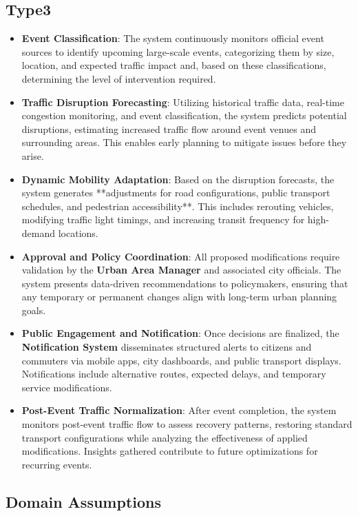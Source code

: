 \documentclass[a4paper,12pt]{article}
\begin{document}
\subsection*{Type3}
\begin{itemize}
    \item \textbf{Event Classification}: The system continuously monitors official event sources to identify upcoming large-scale events, categorizing them by size, location, and expected traffic impact and, based on these classifications, determining the level of intervention required.
    \item \textbf{Traffic Disruption Forecasting}: Utilizing historical traffic data, real-time congestion monitoring, and event classification, the system predicts potential disruptions, estimating increased traffic flow around event venues and surrounding areas. This enables early planning to mitigate issues before they arise.
    \item \textbf{Dynamic Mobility Adaptation}: Based on the disruption forecasts, the system generates **adjustments for road configurations, public transport schedules, and pedestrian accessibility**. This includes rerouting vehicles, modifying traffic light timings, and increasing transit frequency for high-demand locations.
    \item \textbf{Approval and Policy Coordination}: All proposed modifications require validation by the \textbf{Urban Area Manager} and associated city officials. The system presents data-driven recommendations to policymakers, ensuring that any temporary or permanent changes align with long-term urban planning goals.
    \item \textbf{Public Engagement and Notification}: Once decisions are finalized, the \textbf{Notification System} disseminates structured alerts to citizens and commuters via mobile apps, city dashboards, and public transport displays. Notifications include alternative routes, expected delays, and temporary service modifications.
    \item \textbf{Post-Event Traffic Normalization}: After event completion, the system monitors post-event traffic flow to assess recovery patterns, restoring standard transport configurations while analyzing the effectiveness of applied modifications. Insights gathered contribute to future optimizations for recurring events.
\end{itemize}

\newpage

\subsection{Domain Assumptions}
\end{document}
